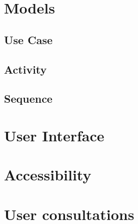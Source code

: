 \section{Models}


\subsection{Use Case}


\subsection{Activity}


\subsection{Sequence}


\section{User Interface}


\section{Accessibility}


\section{User consultations}